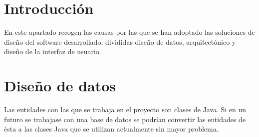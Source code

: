 \label{anex:C}

\section{Introducción}
En este apartado recogen las causas por las que se han adoptado las soluciones de diseño del software desarrollado, divididas diseño de datos, arquitectónico y diseño de la interfaz de usuario.

\section{Diseño de datos}\label{sec:C_2}
Las entidades con las que se trabaja en el proyecto son clases de Java. Si en un futuro se trabajase con una base de datos se podrían convertir las entidades de ésta a las clases Java que se utilizan actualmente sin mayor problema.

